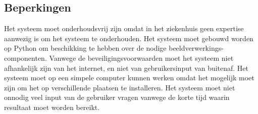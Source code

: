 \subsection{Beperkingen}
Het systeem moet onderhoudsvrij zijn omdat in het ziekenhuis geen expertise aanwezig is om het systeem te onderhouden.
Het systeem moet gebouwd worden op Python om beschikking te hebben over de nodige beeldverwerkings-componenten.
Vanwege de beveiligingsvoorwaarden moet het systeem niet afhankelijk zijn van het internet, en niet van gebruikersinput van buitenaf.
Het systeem moet op een simpele computer kunnen werken omdat het mogelijk moet zijn om het op verschillende plaatsen te installeren.
Het systeem moet niet onnodig veel input van de gebruiker vragen vanwege de korte tijd waarin resultaat moet worden bereikt.